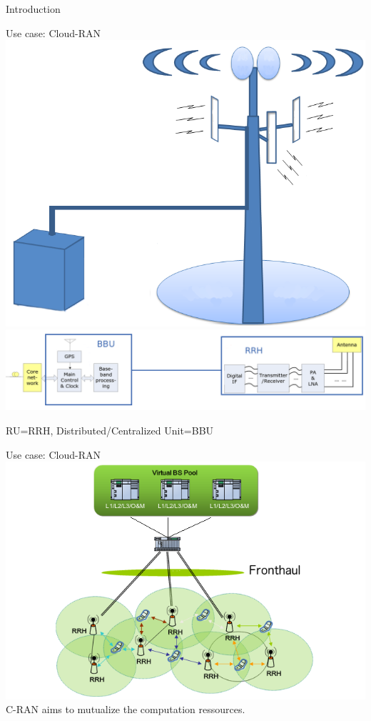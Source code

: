 \documentclass[10 pt]{beamer}
\begin{document}
\begin{section}{Introduction}


\begin{frame}{Use case: Cloud-RAN}
  \centering
  \includegraphics[scale=0.2]{cloudbts.png}\\
  \includegraphics[scale=0.175]{BBURRH.png}
  
   RU=RRH, Distributed/Centralized Unit=BBU
\end{frame}



\begin{frame}{Use case: Cloud-RAN}
  \centering
  \includegraphics[scale=0.3]{CRAN}\\
  \vspace{0.5cm}
  \pause
  C-RAN aims to mutualize the computation ressources.
  

\end{frame}
\end{section}
\end{document}

